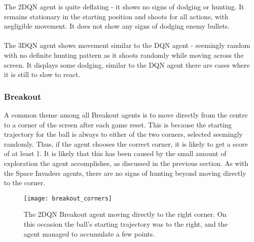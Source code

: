 The 2DQN agent is quite deflating - it shows no signs of dodging or hunting. It remains stationary in the starting position and shoots for all actions, with negligible movement. It does not show any signs of dodging enemy bullets. \paragraph{}

The 3DQN agent shows movement similar to the DQN agent - seemingly random with no definite hunting pattern as it shoots randomly while moving across the screen. It displays some dodging, similar to the DQN agent there are cases where it is still to slow to react.

\subsubsection{Breakout}
A common theme among all Breakout agents is to move directly from the centre to a corner of the screen after each game reset. This is because the starting trajectory for the ball is always to either of the two corners, selected seemingly randomly. Thus, if the agent chooses the correct corner, it is likely to get a score of at least 1. It is likely that this has been caused by the small amount of exploration the agent accomplishes, as discussed in the previous section. As with the Space Invaders agents, there are no signs of hunting beyond moving directly to the corner.

\begin{figure}[h]
	\centering
	\texttt{[image: breakout\_corners]}
	\caption{The 2DQN Breakout agent moving directly to the right corner. On this occasion the ball's starting trajectory was to the right, and the agent managed to accumulate a few points.}
\end{figure}

